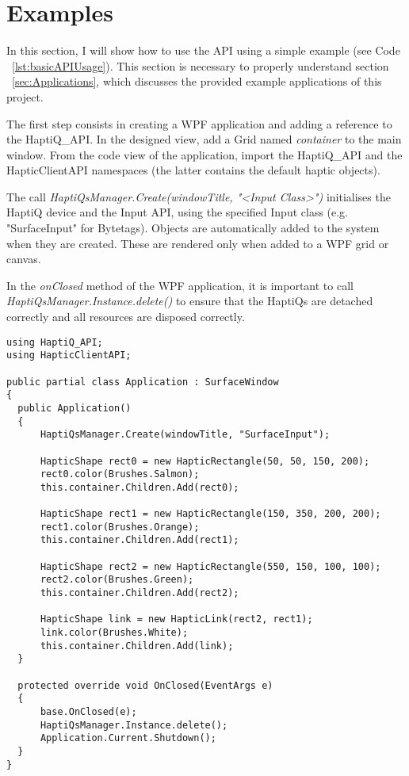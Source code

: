 
\section{Examples}

In this section, I will show how to use the API using a simple example (see Code ~\ref{lst:basicAPIUsage}). This section is necessary to properly understand section ~\ref{sec:Applications}, which discusses the provided example applications of this project.

The first step consists in creating a WPF application and adding a reference to the HaptiQ\_API. In the designed view, add a Grid named \textit{container} to the main window. From the code view of the application, import the HaptiQ\_API and the HapticClientAPI namespaces (the latter contains the default haptic objects). 

The call \textit{HaptiQsManager.Create(windowTitle, "\textless Input Class\textgreater")} initialises the HaptiQ device and the Input API, using the specified Input class (e.g. "SurfaceInput" for Bytetags). 
Objects are automatically added to the system when they are created. These are rendered only when added to a WPF grid or canvas. 

In the \textit{onClosed} method of the WPF application, it is important to call \textit{HaptiQsManager.Instance.delete()} to ensure that the HaptiQs are detached correctly and all resources are disposed correctly.

\lstset{style=sharpc}
\begin{lstlisting}[caption={Basic API usage},label={lst:basicAPIUsage}]
using HaptiQ_API;
using HapticClientAPI;

public partial class Application : SurfaceWindow
{
  public Application()
  {
      HaptiQsManager.Create(windowTitle, "SurfaceInput");
      
      HapticShape rect0 = new HapticRectangle(50, 50, 150, 200);
      rect0.color(Brushes.Salmon);
      this.container.Children.Add(rect0);
      
      HapticShape rect1 = new HapticRectangle(150, 350, 200, 200);
      rect1.color(Brushes.Orange);
      this.container.Children.Add(rect1);
      
      HapticShape rect2 = new HapticRectangle(550, 150, 100, 100);
      rect2.color(Brushes.Green);
      this.container.Children.Add(rect2);
      
      HapticShape link = new HapticLink(rect2, rect1);
      link.color(Brushes.White);
      this.container.Children.Add(link);
  }
  
  protected override void OnClosed(EventArgs e)
  {
      base.OnClosed(e);
      HaptiQsManager.Instance.delete();
      Application.Current.Shutdown();
  }
}
\end{lstlisting}

